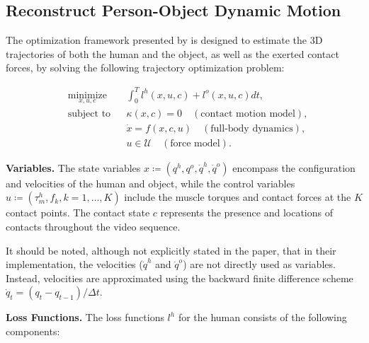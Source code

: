 \subsection{Reconstruct Person-Object Dynamic Motion}
\label{subsec:reconstruct_original}

The optimization framework presented by \citet{li2019estimating} is designed to estimate the 3D trajectories of both the human and the object, 
as well as the exerted contact forces, by solving the following trajectory optimization problem: 

\begin{equation*}
    \begin{aligned}
        & \underset{x,u,c}{\text{minimize}}
        & & \int_{0}^{T} l^h(x, u, c) + l^o(x, u, c)dt, \\
        & \text{subject to}
        & & \kappa(x, c) = 0 \quad (\text{contact motion model}), \\
        &&& \dot{x} = f (x, c, u) \quad (\text{full-body dynamics}), \\
        &&& u \in \mathcal{U} \quad (\text{force model}).
    \end{aligned}
\end{equation*}

\noindent\textbf{Variables.} The state variables \(x \coloneqq (q^h, q^o, \dot{q}^h, \dot{q}^o)\) encompass the configuration and velocities of 
the human and object, while the control variables \(u \coloneqq (\tau_m^h, f_k, k=1, \dots, K)\) include the muscle torques and contact forces 
at the \(K\) contact points. The contact state \(c\) represents the presence and locations of contacts throughout the video sequence. 

It should be noted, although not explicitly stated in the paper, that in their implementation, the velocities (\(\dot{q}^h\) and \(\dot{q}^o\))
are not directly used as variables. Instead, velocities are approximated using the backward finite difference scheme 
\(\dot{q}_t = (q_t - q_{t - 1}) / \Delta t\).

\noindent\textbf{Loss Functions.} The loss functions \(l^h\) for the human consists of the following components:

